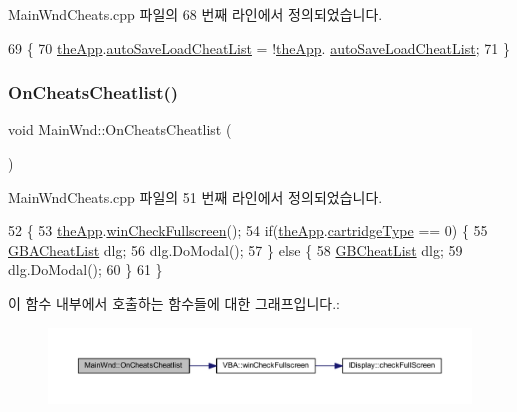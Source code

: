 Main\+Wnd\+Cheats.\+cpp 파일의 68 번째 라인에서 정의되었습니다.


\begin{DoxyCode}
69 \{
70   \mbox{\hyperlink{_v_b_a_8cpp_a8095a9d06b37a7efe3723f3218ad8fb3}{theApp}}.\mbox{\hyperlink{class_v_b_a_a234d3693fb47b5ca956545eb7f9671fb}{autoSaveLoadCheatList}} = !\mbox{\hyperlink{_v_b_a_8cpp_a8095a9d06b37a7efe3723f3218ad8fb3}{theApp}}.
      \mbox{\hyperlink{class_v_b_a_a234d3693fb47b5ca956545eb7f9671fb}{autoSaveLoadCheatList}};
71 \}
\end{DoxyCode}
\mbox{\label{class_main_wnd_a1559502f63289fd4d3414ef1a287b1d8}} 
\subsubsection{\texorpdfstring{On\+Cheats\+Cheatlist()}{OnCheatsCheatlist()}}
{\footnotesize\ttfamily void Main\+Wnd\+::\+On\+Cheats\+Cheatlist (\begin{DoxyParamCaption}{ }\end{DoxyParamCaption})\hspace{0.3cm}{\ttfamily [protected]}}



Main\+Wnd\+Cheats.\+cpp 파일의 51 번째 라인에서 정의되었습니다.


\begin{DoxyCode}
52 \{
53   \mbox{\hyperlink{_v_b_a_8cpp_a8095a9d06b37a7efe3723f3218ad8fb3}{theApp}}.\mbox{\hyperlink{class_v_b_a_a340eaeeb7fcfc242f08ac3442d991a96}{winCheckFullscreen}}();
54   \textcolor{keywordflow}{if}(\mbox{\hyperlink{_v_b_a_8cpp_a8095a9d06b37a7efe3723f3218ad8fb3}{theApp}}.\mbox{\hyperlink{class_v_b_a_af300759fcbc7eeb00ce73f956fc5ddb7}{cartridgeType}} == 0) \{
55     \mbox{\hyperlink{class_g_b_a_cheat_list}{GBACheatList}} dlg;
56     dlg.DoModal();
57   \} \textcolor{keywordflow}{else} \{
58     \mbox{\hyperlink{class_g_b_cheat_list}{GBCheatList}} dlg;
59     dlg.DoModal();
60   \}
61 \}
\end{DoxyCode}
이 함수 내부에서 호출하는 함수들에 대한 그래프입니다.\+:
\nopagebreak
\begin{figure}[H]
\begin{center}
\leavevmode
\includegraphics[width=350pt]{class_main_wnd_a1559502f63289fd4d3414ef1a287b1d8_cgraph}
\end{center}
\end{figure}
\mbox{\label{class_main_wnd_a0bd860492fa9bd1b58a3baf46bda6cad}} 
